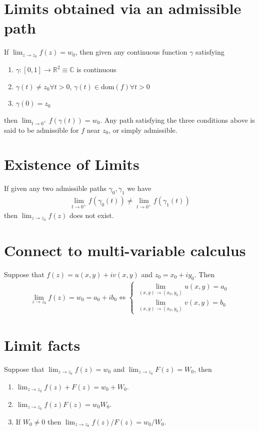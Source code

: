 \documentclass{article}
\theoremstyle{definition}
\newcommand{\R}{\mathbb{R}}
\newcommand{\C}{\mathbb{C}}
\begin{document}
\section{Limits obtained via an admissible path}

If $\lim_{z \to z_0} f(z) = w_0$, then given any continuous function $\gamma$ satisfying
\begin{enumerate}
	\item $\gamma: [0,1] \to \R^2 \equiv \C$ is continuous
	\item $\gamma(t) \neq z_0 \forall t > 0$, $\gamma(t) \in \text{dom}(f) \forall t > 0$
	\item $\gamma(0) = z_0$
\end{enumerate}
then $\lim_{t \to 0^+} f(\gamma(t)) = w_0$. Any path satisfying the three conditions above is said to be admissible for $f$ near $z_0$, or simply admissible. 

\section{Existence of Limits}

If given any two admissible paths $\gamma_0, \gamma_1$ we have
\begin{align}
\lim_{t \to 0^+} f(\gamma_0(t)) \neq \lim_{t \to 0^+}f(\gamma_1(t))
\end{align}
then $\lim_{z \to z_0} f(z)$ does not exist. 


\section{Connect to multi-variable calculus}

Suppose that $f(z) = u(x,y) + iv(x,y)$ and $z_0 = x_0 + iy_0$. Then 
\begin{align}
\lim_{z \to z_0} f(z) = w_0 = a_0 + ib_0
\iff
\begin{cases}
\lim_{(x,y)\to(x_0,y_0)}u(x,y) = a_0 \\ \lim_{(x,y)\to(x_0,y_0)}v(x,y) = b_0
\end{cases}
\end{align} 

\section{Limit facts}


Suppose that $\lim_{z \to z_0} f(z) = w_0$ and $\lim_{z \to z_0} F(z) = W_0$, then 
\begin{enumerate}
	\item $\lim_{z \to z_0} f(z) + F(z) = w_0 + W_0$.
	
	\item $\lim_{z \to z_0} f(z)F(z) = w_0 W_0$.
	
	\item If $W_0 \neq 0$ then $\lim_{z \to z_0} f(z)/F(z) = w_0 / W_0$.
\end{enumerate}
\end{document}
